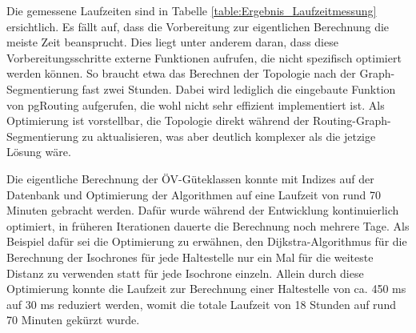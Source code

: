 Die gemessene Laufzeiten sind in Tabelle \ref{table:Ergebnis_Laufzeitmessung} ersichtlich.
Es fällt auf, dass die Vorbereitung zur eigentlichen Berechnung die meiste Zeit beansprucht.
Dies liegt unter anderem daran, dass diese Vorbereitungsschritte externe Funktionen aufrufen, die nicht spezifisch optimiert werden können.
So braucht etwa das Berechnen der Topologie nach der Graph-Segmentierung fast zwei Stunden.
Dabei wird lediglich die eingebaute Funktion von pgRouting aufgerufen, die wohl nicht sehr effizient implementiert ist.
Als Optimierung ist vorstellbar, die Topologie direkt während der Routing-Graph-Segmentierung zu aktualisieren, was aber deutlich komplexer als die jetzige Lösung wäre.

Die eigentliche Berechnung der \acs{ÖV}-Güteklassen konnte mit Indizes auf der Datenbank und Optimierung der Algorithmen auf eine Laufzeit von rund 70 Minuten gebracht werden.
Dafür wurde während der Entwicklung kontinuierlich optimiert, in früheren Iterationen dauerte die Berechnung noch mehrere Tage.
Als Beispiel dafür sei die Optimierung zu erwähnen, den Dijkstra-Algorithmus für die Berechnung der \glspl{Isochrone} für jede Haltestelle nur ein Mal für die weiteste Distanz zu verwenden statt für jede \gls{Isochrone} einzeln.
Allein durch diese Optimierung konnte die Laufzeit zur Berechnung einer Haltestelle von ca. 450 ms auf 30 ms reduziert werden, womit die totale Laufzeit von 18 Stunden auf rund 70 Minuten gekürzt wurde.


